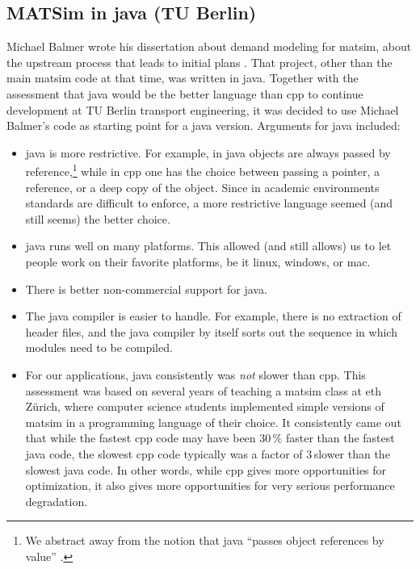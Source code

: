 \subsection{MATSim in \protect\gls{java} (TU Berlin)}
\label{sec:matsim-in-java}
Michael Balmer wrote his dissertation about demand modeling for \gls{matsim}, \ie about the upstream process that leads to initial plans
\citep{Balmer2007phd}.  That project, other than the main \gls{matsim} code at that time, was written in \gls{java}.  Together with the assessment that \gls{java} would be the better language than \gls{cpp} to continue development at TU Berlin transport engineering, it was decided to use Michael Balmer's code as starting point for a \gls{java} version.  Arguments for \gls{java} included:
%
\begin{itemize}\styleItemize
\item  \gls{java} is more restrictive. For example, in \gls{java} objects are always passed by reference,\footnote{%
%
We abstract away from the notion that \gls{java} ``passes object references by value'' \citep{...}.
%
} while in \gls{cpp} one has the choice between passing a pointer, a reference, or a deep copy of the object.  Since in academic environments standards are difficult to enforce, a more restrictive language seemed (and still seems) the better choice.

\item \gls{java} runs well on many platforms.  This allowed (and still allows) us to let people work on their favorite platforms, be it \gls{linux}, \gls{windows}, or \gls{mac}.

\item There is better non-commercial support for \gls{java}. 

\item The \gls{java} compiler is easier to handle.  For example, there is no extraction of header files, and the \gls{java} compiler by itself sorts out the sequence in which modules need to be compiled.

\item For our applications, \gls{java} consistently was \emph{not} slower than \gls{cpp}.  This assessment was based on several years of teaching a \gls{matsim} class at \gls{eth} Zürich, where computer science students implemented simple versions of \gls{matsim} in a programming language of their choice.  It consistently came out that while the fastest \gls{cpp} code may have been 30\,\% faster than the fastest \gls{java} code, the slowest \gls{cpp} code typically was a factor of 3\,slower than the slowest \gls{java} code. In other words, while \gls{cpp} gives more opportunities for optimization, it also gives more opportunities for very serious performance degradation.


\end{itemize}
